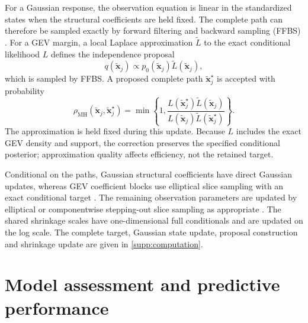 \documentclass[11pt,a4paper]{article}
\begin{document}
	For a Gaussian response, the observation equation is linear in the
	standardized states when the structural coefficients are held fixed. The
	complete path can therefore be sampled exactly by forward filtering and
	backward sampling (FFBS) \citep{carter1994,fruhwirthschnatter1994,durbin2000,durbin2012}.
	For a GEV margin, a local Laplace approximation \(\widetilde L\) to the exact
	conditional likelihood \(L\) defines the independence proposal
	\begin{equation}\label{eq:gev-path-proposal}
		q(\widetilde{\bm x}_j)
		\propto
		p_0(\widetilde{\bm x}_j)\widetilde L(\widetilde{\bm x}_j),
	\end{equation}
	which is sampled by FFBS. A proposed complete path
	\(\widetilde{\bm x}_j^\star\) is accepted with probability
	\begin{equation}\label{eq:mh}
		\rho_{\mathrm{MH}}
		(\widetilde{\bm x}_j,\widetilde{\bm x}_j^\star)
		=
		\min\!\left\{
		1,
		\frac{
			L(\widetilde{\bm x}_j^\star)\widetilde L(\widetilde{\bm x}_j)
		}{
			L(\widetilde{\bm x}_j)\widetilde L(\widetilde{\bm x}_j^\star)
		}
		\right\}.
	\end{equation}
	The approximation is held fixed during this update. Because \(L\) includes
	the exact GEV density and support, the correction preserves the
	specified conditional posterior; approximation quality affects efficiency,
	not the retained target.
	
	Conditional on the paths, Gaussian structural coefficients have direct
	Gaussian updates, whereas GEV coefficient blocks use elliptical slice
	sampling with an exact conditional target \citep{murray2010}. The remaining
	observation parameters are updated by elliptical
	or componentwise stepping-out slice sampling as appropriate \citep{neal2003}.
	The shared shrinkage scales have one-dimensional full conditionals and
are updated on the log scale. The complete target, Gaussian state update,
proposal construction and shrinkage update are given in \cref{supp:computation}.
	
	\section{Model assessment and predictive performance}
	\label{sec::goodness-of-fit}
	
\end{document}
